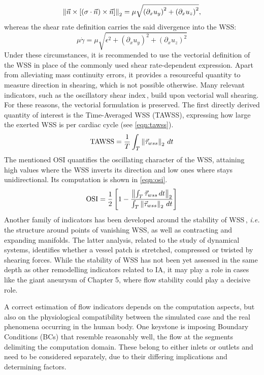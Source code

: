 \begin{equation*}
	\left\lVert\vec{n} \times \left[ (\sigma\cdot\vec{n})\times \vec{n}\right]\right\rVert_2 = \mu\sqrt{ {(\partial_x u_y)}^2 + {(\partial_x u_z)}^2},
\end{equation*}
whereas the shear rate definition carries the said divergence into the WSS:
\begin{equation*}
	\mu\dot{\gamma} = \mu\sqrt{ \epsilon^2 + {(\partial_x u_y)}^2 + {{(\partial_x u_z)}}^2}
\end{equation*}
Under these circumstances, it is recommended to use the vectorial definition of the WSS in place of the commonly used shear rate-dependent expression. Apart from alleviating mass continuity errors, it provides a resourceful quantity to measure direction in shearing, which is not possible otherwise. Many relevant indicators, such as the oscillatory shear index\,\cite{Meng2014}, build upon vectorial wall shearing. For these reasons, the vectorial formulation is preserved. The first directly derived quantity of interest is the Time-Averaged WSS (TAWSS), expressing how large the exerted WSS is per cardiac cycle (see \autoref{eqn:tawss}).
\begin{equation}
	\text{TAWSS} = \frac{1}{T}\int_T \left\lVert\vec{\tau}_{wss}\right\rVert_2 \,dt
	\label{eqn:tawss}
\end{equation}
The mentioned OSI quantifies the oscillating character of the WSS, attaining high values where the WSS inverts its direction and low ones where stays unidirectional. Its computation is shown in \autoref{eqn:osi}.
\begin{equation}
	\text{OSI} = \frac{1}{2}\left[ 1 - \frac{\left\lVert\int_T \vec{\tau}_{wss} \,dt\right\rVert_2}{\int_T \left\lVert\vec{\tau}_{wss}\right\rVert_2 \,dt} \right]
	\label{eqn:osi}
\end{equation}
Another family of indicators has been developed around the stability of WSS\,\cite{Morbiducci2020, Mazzi2020}, \textit{i.e.} the structure around points of vanishing WSS, as well as contracting and expanding manifolds. The latter analysis, related to the study of dynamical systems, identifies whether a vessel patch is stretched, compressed or twisted by shearing forces. While the stability of WSS has not been yet assessed in the same depth as other remodelling indicators related to IA, it may play a role in cases like the giant aneurysm of Chapter 5, where flow stability could play a decisive role.

A correct estimation of flow indicators depends on the computation aspects, but also on the physiological compatibility between the simulated case and the real phenomena occurring in the human body. One keystone is imposing Boundary Conditions (BCs) that resemble reasonably well, the flow at the segments delimiting the computation domain. These belong to either inlets or outlets and need to be considered separately, due to their differing implications and determining factors.


